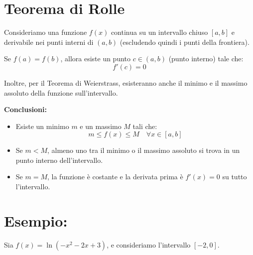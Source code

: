 \documentclass[12pt]{article}
\begin{document}
\Huge

\section*{Teorema di Rolle}

Consideriamo una funzione \( f(x) \) continua su un intervallo chiuso \([a, b]\) e derivabile nei punti interni di \((a, b)\) (escludendo quindi i punti della frontiera).  

Se \( f(a) = f(b) \), allora esiste un punto \( c \in (a, b) \) (punto interno) tale che:  
\[
f'(c) = 0
\]

Inoltre, per il Teorema di Weierstrass, esisteranno anche il minimo e il massimo assoluto della funzione sull’intervallo.  

\vspace{0.5cm}

\textbf{Conclusioni:}
\begin{itemize}
    \item Esiste un minimo \( m \) e un massimo \( M \) tali che:  
    \[
    m \leq f(x) \leq M \quad \forall x \in [a, b]
    \]
    \item Se \( m < M \), almeno uno tra il minimo o il massimo assoluto si trova in un punto interno dell’intervallo.
    \item Se \( m = M \), la funzione è costante e la derivata prima è \( f'(x) = 0 \) su tutto l’intervallo.
\end{itemize}

\vspace{1cm}

\section*{Esempio:}

Sia \( f(x) = \ln(-x^2 - 2x + 3) \), e consideriamo l'intervallo \([-2, 0]\).  
\end{document}
